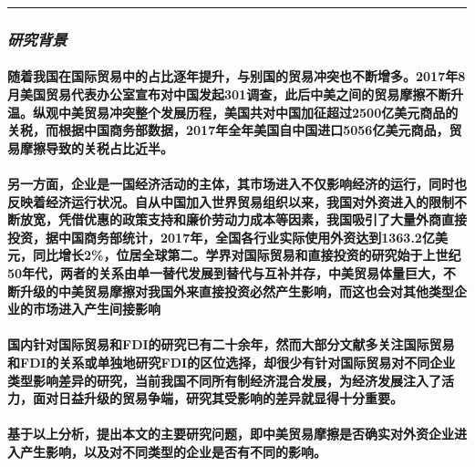 \documentclass[]{article}
\let\oldparagraph\paragraph
\renewcommand{\paragraph}[1]{\oldparagraph{#1}\mbox{}}
\begin{document}
\begin{center}\rule{0.5\linewidth}{\linethickness}\end{center}

\hypertarget{section-4}{%
\subsubsection{\texorpdfstring{\textbf{\emph{研究背景}}}{研究背景}}\label{section-4}}

\hypertarget{section-5}{%
\paragraph{随着我国在国际贸易中的占比逐年提升，与别国的贸易冲突也不断增多。2017年8月美国贸易代表办公室宣布对中国发起301调查，此后中美之间的贸易摩擦不断升温。纵观中美贸易冲突整个发展历程，美国共对中国加征超过2500亿美元商品的关税，而根据中国商务部数据，2017年全年美国自中国进口5056亿美元商品，贸易摩擦导致的关税占比近半。}\label{section-5}}

\hypertarget{section-6}{%
\paragraph{另一方面，企业是一国经济活动的主体，其市场进入不仅影响经济的运行，同时也反映着经济运行状况。自从中国加入世界贸易组织以来，我国对外资进入的限制不断放宽，凭借优惠的政策支持和廉价劳动力成本等因素，我国吸引了大量外商直接投资，据中国商务部统计，2017年，全国各行业实际使用外资达到1363.2亿美元，同比增长2\%，位居全球第二。学界对国际贸易和直接投资的研究始于上世纪50年代，两者的关系由单一替代发展到替代与互补并存，中美贸易体量巨大，不断升级的中美贸易摩擦对我国外来直接投资必然产生影响，而这也会对其他类型企业的市场进入产生间接影响}\label{section-6}}

\hypertarget{fdifdifdi}{%
\paragraph{国内针对国际贸易和FDI的研究已有二十余年，然而大部分文献多关注国际贸易和FDI的关系或单独地研究FDI的区位选择，却很少有针对国际贸易对不同企业类型影响差异的研究，当前我国不同所有制经济混合发展，为经济发展注入了活力，面对日益升级的贸易争端，研究其受影响的差异就显得十分重要。}\label{fdifdifdi}}

\hypertarget{section-7}{%
\paragraph{基于以上分析，提出本文的主要研究问题，即中美贸易摩擦是否确实对外资企业进入产生影响，以及对不同类型的企业是否有不同的影响。}\label{section-7}}
\end{document}
